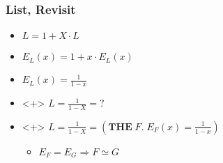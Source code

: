 \begin{frame}
\frametitle{List, Revisit}

\begin{itemize}
\item $L = 1 + X \cdot L$
\item $E_L(x) = 1 + x \cdot E_L(x)$
\item $E_L(x) = \frac{1}{1-x}$
\item 
\begin{onlyenv}<+>
$L = \frac{1}{1 - X} = ?$
\end{onlyenv}

\item 
\begin{onlyenv}<+>
$L = \frac{1}{1 - X} = (\textbf{THE}\; F.\; E_F(x) = \frac{1}{1-x})$
\end{onlyenv}

\begin{itemize}
\item $E_F = E_G \Longrightarrow F \simeq G$ 
\end{itemize}
\end{itemize}
\end{frame}
